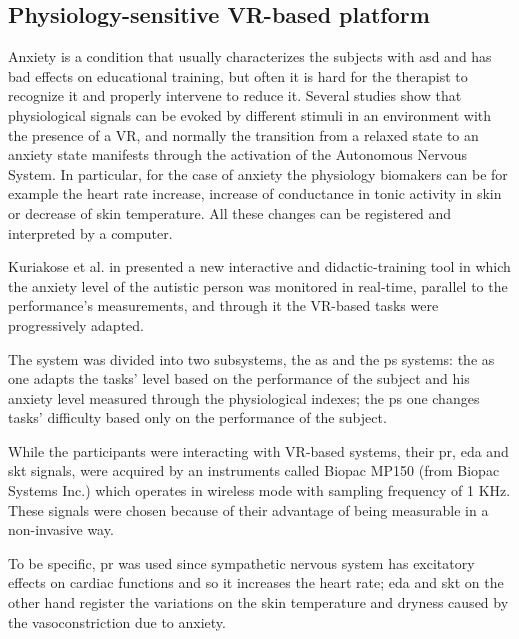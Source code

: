 \documentclass[12pt,journal,draftclsnofoot,onecolumn]{IEEEtran}
\makeatletter
\let\origsubsubsection\subsubsection
\renewcommand\subsubsection{\@ifstar{\starsubsubsection}{\nostarsubsubsection}}
\newcommand\nostarsubsubsection[1]
{\subsubsectionprelude\origsubsubsection{#1}}
\newcommand\subsubsectionprelude{%
  \vspace{6pt}
}
\makeatother
\begin{document}
\subsection{Physiology-sensitive VR-based platform}
\label{sec:anxiety}

Anxiety is a condition that usually characterizes the subjects with \gls{asd} and has bad effects on educational training, but often it is hard for the therapist to recognize it and properly intervene to reduce it. Several studies show that physiological signals can be evoked by different stimuli in an environment with the presence of a VR, and normally the transition from a relaxed state to an anxiety state manifests through the activation of the Autonomous Nervous System. In particular, for the case of anxiety the physiology biomakers can be for example the heart rate increase, increase of conductance in tonic activity in skin or decrease of skin temperature. All these changes can be registered and interpreted by a computer.

Kuriakose et al. in \cite{Kuriakose2017} presented a new interactive and didactic-training tool in which the anxiety level of the autistic person was monitored in real-time, parallel to the performance's measurements, and through it the VR-based tasks were progressively adapted.

\subsubsection{Structure of the trial}
The system was divided into two subsystems, the \gls{as} and the \gls{ps} systems: the \gls{as} one adapts the tasks' level based on the performance of the subject and his anxiety level measured through the physiological indexes; the \gls{ps} one changes tasks' difficulty based only on the performance of the subject.

While the participants were interacting with VR-based systems, their \gls{pr}, \gls{eda} and \gls{skt} signals, were acquired by an instruments called Biopac MP150 (from Biopac Systems Inc.) which operates in wireless mode with sampling frequency of 1 KHz. These signals were chosen because of their advantage of being measurable in a non-invasive way.

To be specific, \gls{pr} was used since sympathetic nervous system has excitatory effects on cardiac functions and so it increases the heart rate; \gls{eda} and \gls{skt} on the other hand register the variations on the skin temperature and dryness caused by the vasoconstriction due to anxiety.\\
\end{document}
